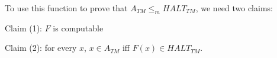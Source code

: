 \documentclass[12pt, oneside]{article}
\begin{document}
    To use this function  to prove that $A_{TM} \leq_m HALT_{TM}$, we need  two claims:

    
    Claim (1): $F$ is computable \phantom{\hspace{2in}}
    
    \vfill

    Claim (2): for every  $x$,  $x \in  A_{TM}$ iff $F(x) \in HALT_{TM}$.  
    
    \vfill
    \vfill
    \vfill \vfill
\end{document}
